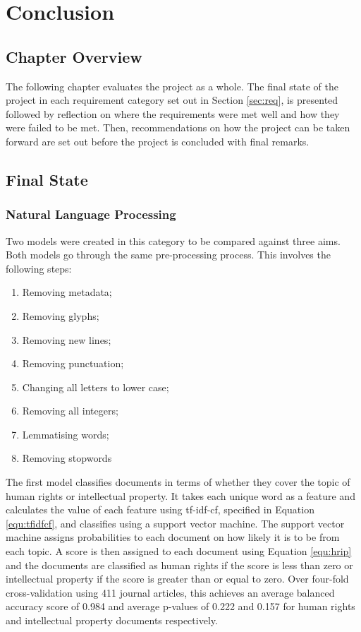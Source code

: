 \chapter{Conclusion}
	\section{Chapter Overview}
		The following chapter evaluates the project as a whole. The final state of the project in each requirement category set out in Section \ref{sec:req}, is presented followed by reflection on where the requirements were met well and how they were failed to be met. Then, recommendations on how the project can be taken forward are set out before the project is concluded with final remarks.
	\section{Final State}
		\subsection{Natural Language Processing}
			Two models were created in this category to be compared against three aims. Both models go through the same pre-processing process. This involves the following steps: 

			\begin{enumerate} 
				\item Removing metadata;
				\item Removing glyphs;
				\item Removing new lines;
				\item Removing punctuation;
				\item Changing all letters to lower case;
				\item Removing all integers;
				\item Lemmatising words;
				\item Removing stopwords
			\end{enumerate} 

			The first model classifies documents in terms of whether they cover the topic of human rights or intellectual property. It takes each unique word as a feature and calculates the value of each feature using tf-idf-cf, specified in Equation \ref{equ:tfidfcf}, and classifies using a support vector machine. The support vector machine assigns probabilities to each document on how likely it is to be from each topic. A score is then assigned to each document using Equation \ref{equ:hrip} and the documents are classified as human rights if the score is less than zero or intellectual property if the score is greater than or equal to zero. Over four-fold cross-validation using 411 journal articles, this achieves an average balanced accuracy score of 0.984 and average p-values of 0.222 and 0.157 for human rights and intellectual property documents respectively. 


